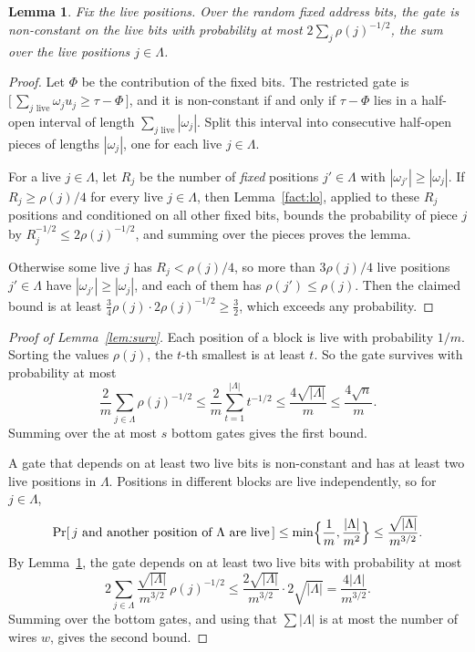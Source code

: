 \documentclass[11pt,letterpaper]{article}
\newtheorem{lemma}[theorem]{Lemma}
\theoremstyle{remark}
\newcommand{\ind}[1]{\bigl[\,#1\,\bigr]}
\begin{document}
\begin{lemma}\label{lem:onerestr}
Fix the live positions. Over the random fixed address bits, the gate is
non-constant on the live bits with probability at most
$2\sum_{j}\rho(j)^{-1/2}$, the sum over the live positions $j\in \Lambda$.
\end{lemma}
\begin{proof}
Let $\Phi$ be the contribution of the fixed bits. The restricted gate is
$\ind{\sum_{j\text{ live}}\omega_ju_j\ge\tau-\Phi}$, and it is non-constant
if and only if $\tau-\Phi$ lies in a half-open interval of length
$\sum_{j\text{ live}}|\omega_j|$. Split this interval into consecutive
half-open pieces of lengths $|\omega_j|$, one for each live $j\in \Lambda$.

For a live $j\in \Lambda$, let $R_j$ be the number of \emph{fixed} positions
$j'\in \Lambda$ with $|\omega_{j'}|\ge|\omega_j|$. If $R_j\ge\rho(j)/4$ for every live
$j\in \Lambda$, then Lemma~\ref{fact:lo}, applied to these $R_j$ positions and
conditioned on all other fixed bits, bounds the probability of piece $j$ by
$R_j^{-1/2}\le2\rho(j)^{-1/2}$, and summing over the pieces proves the lemma.

Otherwise some live $j$ has $R_j<\rho(j)/4$, so more than $3\rho(j)/4$ live
positions $j'\in \Lambda$ have $|\omega_{j'}|\ge|\omega_j|$, and each of them has
$\rho(j')\le\rho(j)$. Then the claimed bound is at least
$\tfrac34\rho(j)\cdot2\rho(j)^{-1/2}\ge\tfrac32$, which exceeds any
probability.
\end{proof}

\begin{proof}[Proof of Lemma~\ref{lem:surv}]
Each position of a block is live with probability $1/m$. Sorting the values
$\rho(j)$, the $t$-th smallest is at least $t$. So the gate survives with
probability at most
\[
\frac2m\sum_{j\in \Lambda}\rho(j)^{-1/2}\le\frac2m\sum_{t=1}^{|\Lambda|}t^{-1/2}
\le\frac{4\sqrt{|\Lambda|}}{m}\le\frac{4\sqrt n}{m}.
\]
Summing over the at most $s$ bottom gates gives the first bound.

A gate that depends on at least two live bits is non-constant and has at
least two live positions in $\Lambda$. Positions in different blocks are live
independently, so for $j\in \Lambda$,
\[
\Pr[\,j\text{ and another position of }\Lambda\text{ are live}\,]
\le\min\Bigl\{\frac1m,\frac{|\Lambda|}{m^2}\Bigr\}\le\frac{\sqrt{|\Lambda|}}{m^{3/2}}.
\]
By Lemma~\ref{lem:onerestr}, the gate depends on at least two live bits with
probability at most
\[
2\sum_{j\in \Lambda}\frac{\sqrt{|\Lambda|}}{m^{3/2}}\,\rho(j)^{-1/2}
\le\frac{2\sqrt{|\Lambda|}}{m^{3/2}}\cdot2\sqrt{|\Lambda|}=\frac{4|\Lambda|}{m^{3/2}}.
\]
Summing over the bottom gates, and using that $\sum|\Lambda|$ is at most the number
of wires $w$, gives the second bound.
\end{proof}
\end{document}
